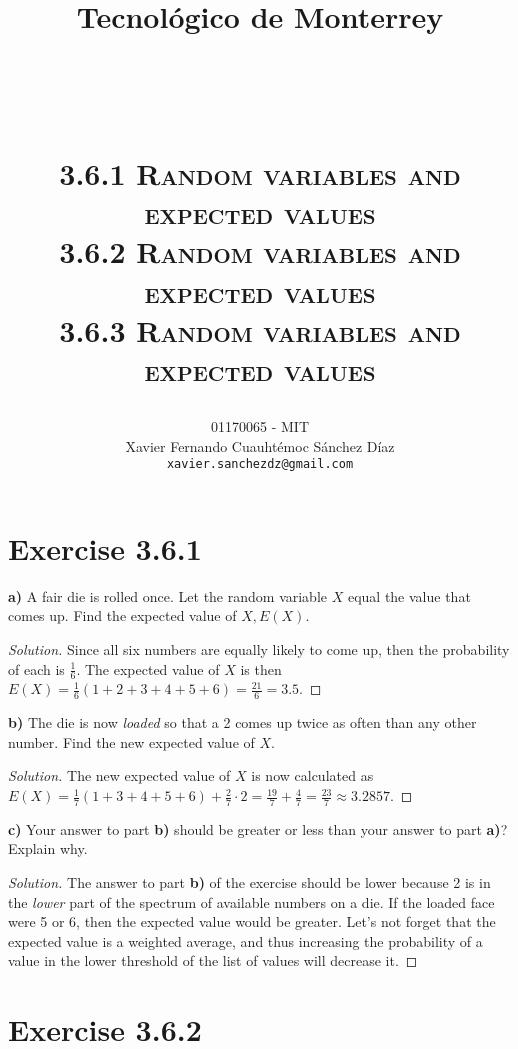 \documentclass[titlepage, letterpaper, fleqn]{article}
\title{
\vspace{1in}
\textbf{Tecnológico de Monterrey} \\
\vspace{0.5in}
\textmd{\mahclass} \\
\large{\textit{\mahteacher}} \\
\vspace{0.5in}
\textsc{\mahtitle}\\
\textsc{3.6.1 Random variables and expected values}\\
\textsc{3.6.2 Random variables and expected values}\\
\textsc{3.6.3 Random variables and expected values}\\
\author{01170065  - MIT \\
Xavier Fernando Cuauhtémoc Sánchez Díaz \\
\texttt{xavier.sanchezdz@gmail.com}}
\date{\mahdate}
}
\newcommand{\spacepls}{\vspace{5mm}}
\renewcommand\qedsymbol{\(\blacksquare\)}
\newenvironment{solution}
{\renewcommand\qedsymbol{$\square$}\begin{proof}[Solution]}
{\end{proof}}
\begin{document}
\begin{titlepage}
\maketitle
\end{titlepage}

%
%

\section{Exercise 3.6.1}

{\large \textbf{a)} A fair die is rolled once.
Let the random variable \(X\) equal the value that comes up.
Find the expected value of \(X, E(X)\).}

\begin{solution}
Since all six numbers are equally likely to come up, then the probability of each is \(\frac{1}{6}\).
The expected value of \(X\) is then \(E(X) = \frac{1}{6}(1 + 2 + 3 + 4 + 5 + 6) = \frac{21}{6} = 3.5\).
\end{solution}

\spacepls

{\large \textbf{b)} The die is now \textit{loaded} so that a 2 comes up twice as often than any other number.
Find the new expected value of \(X\).}

\begin{solution}
The new expected value of \(X\) is now calculated as \(E(X) = \frac{1}{7}(1 + 3 + 4 + 5 + 6) + \frac{2}{7} \cdot 2 = \frac{19}{7} + \frac{4}{7} = \frac{23}{7} \approx 3.2857\).
\end{solution}

\spacepls

{\large \textbf{c)} Your answer to part \textbf{b)} should be greater or less than your answer to part \textbf{a)}? Explain why.}

\begin{solution}
The answer to part \textbf{b)} of the exercise should be lower because 2 is in the \textit{lower} part of the spectrum of available numbers on a die.
If the loaded face were 5 or 6, then the expected value would be greater.
Let's not forget that the expected value is a weighted average, and thus increasing the probability of a value in the lower threshold of the list of values will decrease it.
\end{solution}

\section{Exercise 3.6.2}
\end{document}
